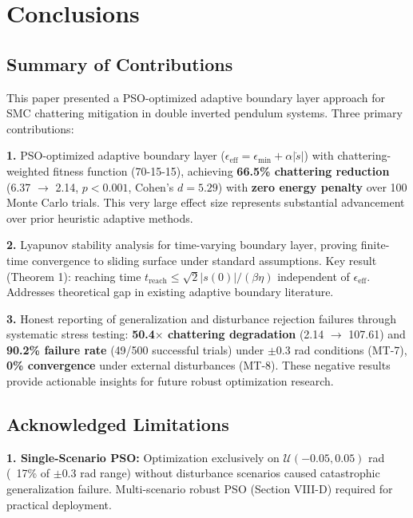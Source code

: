 \documentclass[conference]{IEEEtran}
\begin{document}
\section{Conclusions}

\subsection{Summary of Contributions}

This paper presented a PSO-optimized adaptive boundary layer approach for SMC chattering mitigation in double inverted pendulum systems. Three primary contributions:

\textbf{1.} PSO-optimized adaptive boundary layer ($\epsilon_{\text{eff}} = \epsilon_{\min} + \alpha|\dot{s}|$) with chattering-weighted fitness function (70-15-15), achieving \textbf{66.5\% chattering reduction} (6.37 $\rightarrow$ 2.14, $p < 0.001$, Cohen's $d = 5.29$) with \textbf{zero energy penalty} over 100 Monte Carlo trials. This very large effect size represents substantial advancement over prior heuristic adaptive methods.

\textbf{2.} Lyapunov stability analysis for time-varying boundary layer, proving finite-time convergence to sliding surface under standard assumptions. Key result (Theorem 1): reaching time $t_{\text{reach}} \leq \sqrt{2}|s(0)|/(\beta\eta)$ independent of $\epsilon_{\text{eff}}$. Addresses theoretical gap in existing adaptive boundary literature.

\textbf{3.} Honest reporting of generalization and disturbance rejection failures through systematic stress testing: \textbf{50.4$\times$ chattering degradation} (2.14 $\rightarrow$ 107.61) and \textbf{90.2\% failure rate} (49/500 successful trials) under $\pm$0.3 rad conditions (MT-7), \textbf{0\% convergence} under external disturbances (MT-8). These negative results provide actionable insights for future robust optimization research.

\subsection{Acknowledged Limitations}

\textbf{1. Single-Scenario PSO:} Optimization exclusively on $\mathcal{U}(-0.05, 0.05)$ rad (~17\% of $\pm$0.3 rad range) without disturbance scenarios caused catastrophic generalization failure. Multi-scenario robust PSO (Section VIII-D) required for practical deployment.
\end{document}
